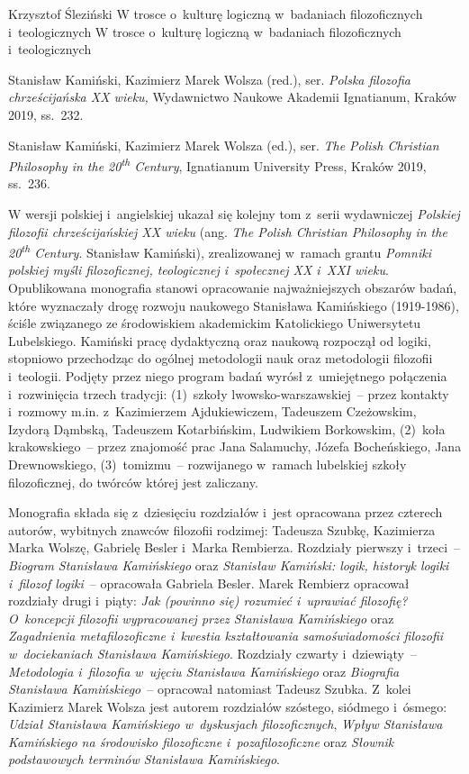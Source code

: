 \begin{recplenv}{Krzysztof Śleziński}
	{W trosce o~kulturę logiczną w~badaniach filozoficznych i~teologicznych}
	{W trosce o~kulturę logiczną w~badaniach filozoficznych\\i~teologicznych}
	{Stanisław Kamiński, Kazimierz Marek Wolsza (red.), ser. \textit{Polska filozofia chrześcijańska XX wieku,}
		Wydawnictwo Naukowe Akademii Ignatianum, Kraków 2019, ss.~232.
		
		Stanisław Kamiński, Kazimierz Marek Wolsza (ed.), ser. \textit{The Polish Christian Philosophy in the
			20\textsuperscript{th} Century}, Ignatianum University Press, Kraków 2019, ss.~236.}







W wersji polskiej i~angielskiej ukazał się kolejny tom z~serii wydawniczej \textit{Polskiej filozofii chrześcijańskiej
XX wieku} (ang. \textit{The Polish Christian Philosophy in the 20\textsuperscript{th} Century}.
Stanisław Kamiński), zrealizowanej w~ramach grantu \textit{Pomniki polskiej myśli filozoficznej,
teologicznej i~społecznej XX i~XXI wieku}. Opublikowana monografia stanowi opracowanie najważniejszych obszarów badań, które
wyznaczały drogę rozwoju naukowego Stanisława Kamińskiego (1919-1986), ściśle związanego ze środowiskiem akademickim
Katolickiego Uniwersytetu Lubelskiego. Kamiński pracę dydaktyczną oraz naukową rozpoczął od logiki, stopniowo
przechodząc do ogólnej metodologii nauk oraz metodologii filozofii i~teologii. Podjęty przez niego program badań wyrósł
z~umiejętnego połączenia i~rozwinięcia trzech tradycji: (1)~szkoły lwowsko-warszawskiej~-- przez kontakty i~rozmowy
m.in. z~Kazimierzem Ajdukiewiczem, Tadeuszem Czeżowskim, Izydorą Dąmbską, Tadeuszem Kotarbińskim, Ludwikiem Borkowskim,
(2)~koła krakowskiego~-- przez znajomość prac Jana Salamuchy, Józefa Bocheńskiego, Jana Drewnowskiego,
(3)~tomizmu~-- rozwijanego w~ramach lubelskiej szkoły filozoficznej, do twórców której jest zaliczany.

Monografia składa się z~dziesięciu rozdziałów i~jest opracowana przez czterech autorów, wybitnych znawców filozofii
rodzimej: Tadeusza Szubkę, Kazimierza Marka Wolszę, Gabrielę Besler i~Marka Rembierza. Rozdziały
pierwszy i~trzeci~-- \textit{Biogram Stanisława Kamińskiego} oraz \textit{Stanisław Kamiński: logik,
historyk logiki i~filozof  logiki}~-- opracowała Gabriela Besler.
Marek Rembierz opracował rozdziały drugi i~piąty:  \textit{Jak (powinno się)
rozumieć i~uprawiać filozofię? O~koncepcji filozofii }\textit{wypracowanej przez Stanisława Kamińskiego} oraz \textit{Zagadnienia
metafilozoficzne i~kwestia kształtowania samoświadomości filozofii w~dociekaniach Stanisława Kamińskiego}. Rozdziały
czwarty i~dziewiąty~-- \textit{Metodologia i~filozofia w~ujęciu Stanisława Kamińskiego} oraz  \textit{Biografia
Stanisława Kamińskiego}~-- opracował natomiast Tadeusz Szubka. Z~kolei Kazimierz Marek Wolsza jest autorem rozdziałów
szóstego, siódmego i~ósmego: \textit{Udział Stanisława Kamińskiego w~dyskusjach filozoficznych}, \textit{Wpływ
Stanisława Kamińskiego na środowisko filozoficzne i~pozafilozoficzne} oraz \textit{Słownik podstawowych terminów
Stanisława Kamińskiego}. 


\end{recplenv}
